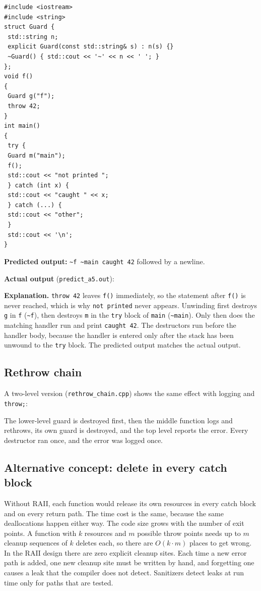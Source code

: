 \documentclass[11pt,a4paper]{article}
\newcommand{\lstout}[2]{}
\begin{document}
\begin{lstlisting}[caption={predict\_a5.cpp (as given)}]
#include <iostream>
#include <string>
struct Guard {
 std::string n;
 explicit Guard(const std::string& s) : n(s) {}
 ~Guard() { std::cout << '~' << n << ' '; }
};
void f()
{
 Guard g("f");
 throw 42;
}
int main()
{
 try {
 Guard m("main");
 f();
 std::cout << "not printed ";
 } catch (int x) {
 std::cout << "caught " << x;
 } catch (...) {
 std::cout << "other";
 }
 std::cout << '\n';
}
\end{lstlisting}

\textbf{Predicted output:} \texttt{\~{}f \~{}main caught 42} followed by a newline.

\textbf{Actual output} (\texttt{predict\_a5.out}):
\lstout{../Task02_RAII_Unwinding/predict_a5.out}{Actual output of predict\_a5}

\textbf{Explanation.} \texttt{throw 42} leaves \texttt{f()} immediately, so the statement after \texttt{f()} is never reached, which is why \texttt{not printed} never appears. Unwinding first destroys \texttt{g} in \texttt{f} (\texttt{\~{}f}), then destroys \texttt{m} in the \texttt{try} block of \texttt{main} (\texttt{\~{}main}). Only then does the matching handler run and print \texttt{caught 42}. The destructors run before the handler body, because the handler is entered only after the stack has been unwound to the \texttt{try} block. The predicted output matches the actual output.

\subsection*{Rethrow chain}
A two-level version (\texttt{rethrow\_chain.cpp}) shows the same effect with logging and \texttt{throw;}:

\lstout{../Task02_RAII_Unwinding/rethrow_chain.out}{Output of rethrow\_chain}

The lower-level guard is destroyed first, then the middle function logs and rethrows, its own guard is destroyed, and the top level reports the error. Every destructor ran once, and the error was logged once.

\subsection*{Alternative concept: delete in every catch block}
Without RAII, each function would release its own resources in every catch block and on every return path. The time cost is the same, because the same deallocations happen either way. The code size grows with the number of exit points. A function with $k$ resources and $m$ possible throw points needs up to $m$ cleanup sequences of $k$ deletes each, so there are $O(k \cdot m)$ places to get wrong. In the RAII design there are zero explicit cleanup sites. Each time a new error path is added, one new cleanup site must be written by hand, and forgetting one causes a leak that the compiler does not detect. Sanitizers detect leaks at run time only for paths that are tested.
\end{document}
